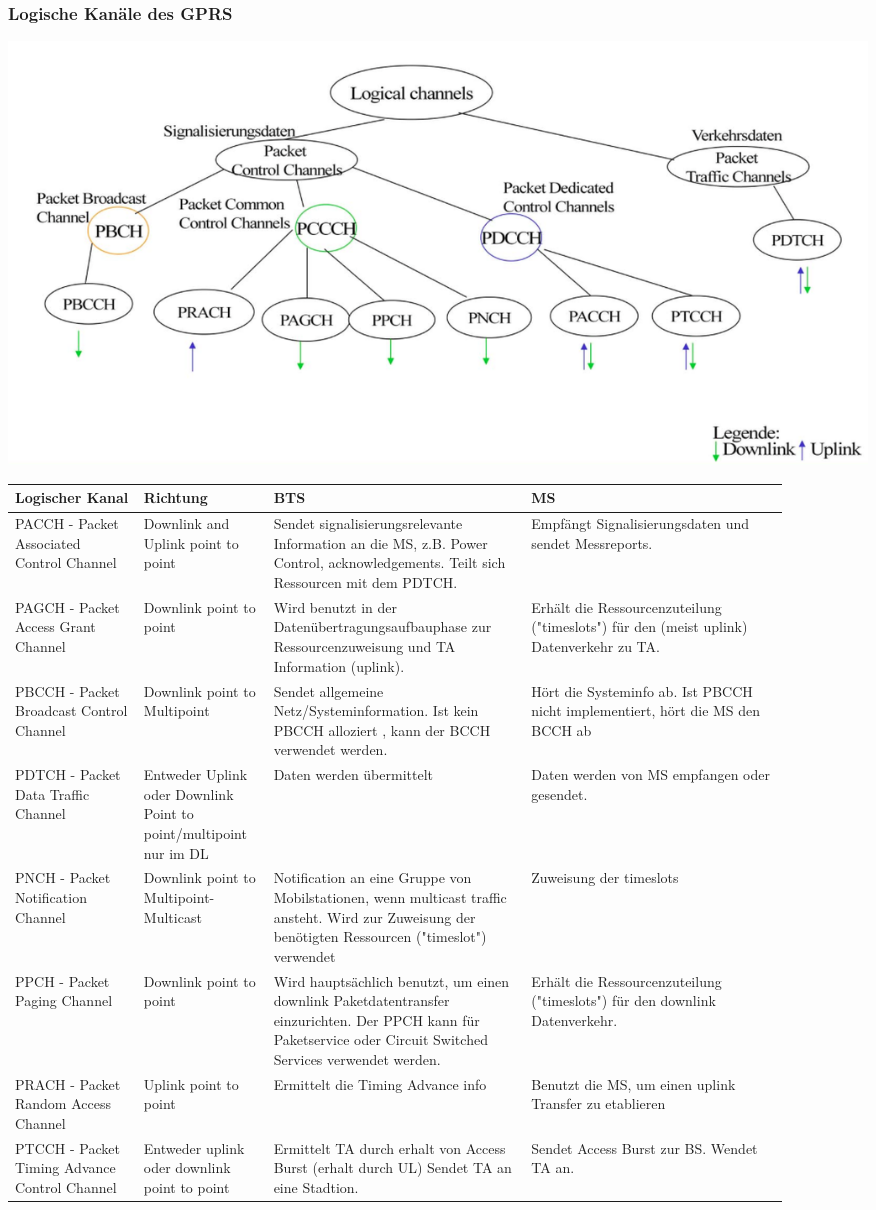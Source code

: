 \subsubsection{Logische Kanäle des GPRS}
\includegraphics[width = 0.6 \linewidth]{./Pics/GPRSKanaele}

\begin{tabular}{p{0.15 \linewidth} p{0.15 \linewidth} p{0.3 \linewidth} p{0.3 \linewidth}}
\toprule
Logischer Kanal & Richtung & BTS & MS \\
\midrule
PACCH - Packet Associated Control Channel & Downlink and Uplink point to point & Sendet signalisierungsrelevante Information an die MS, z.B. Power Control, acknowledgements. Teilt sich Ressourcen mit dem PDTCH. & Empfängt Signalisierungsdaten und sendet Messreports.\\
\midrule
PAGCH - Packet Access Grant Channel & Downlink point to point & Wird benutzt in der Datenübertragungsaufbauphase zur Ressourcenzuweisung und TA Information (uplink). & Erhält die Ressourcenzuteilung ("timeslots") für den (meist uplink) Datenverkehr zu TA. \\
\midrule
PBCCH - Packet Broadcast Control Channel & Downlink point to Multipoint & Sendet allgemeine Netz/Systeminformation. Ist kein PBCCH alloziert , kann der BCCH verwendet werden. & Hört die Systeminfo ab. Ist PBCCH nicht implementiert, hört die MS den BCCH ab \\
\midrule
PDTCH - Packet Data Traffic Channel & Entweder Uplink oder Downlink Point to point/multipoint nur im DL & Daten werden übermittelt & Daten werden von MS empfangen oder gesendet. \\
\midrule
PNCH - Packet Notification Channel & Downlink point to Multipoint-Multicast & Notification an eine Gruppe von Mobilstationen, wenn multicast traffic ansteht. Wird zur Zuweisung der benötigten Ressourcen ("timeslot") verwendet & Zuweisung der timeslots\\
\midrule
PPCH - Packet Paging Channel & Downlink point to point & Wird hauptsächlich benutzt, um einen downlink Paketdatentransfer einzurichten. Der PPCH kann für Paketservice oder Circuit Switched Services verwendet werden. & Erhält die Ressourcenzuteilung ("timeslots") für den downlink Datenverkehr. \\
\midrule
PRACH - Packet Random Access Channel & Uplink point to point & Ermittelt die Timing Advance info & Benutzt die MS, um einen uplink Transfer zu etablieren \\
\midrule
PTCCH - Packet Timing Advance Control Channel & Entweder uplink oder downlink point to point & Ermittelt TA durch erhalt von Access Burst (erhalt durch UL) Sendet TA an eine Stadtion. & Sendet Access Burst zur BS. Wendet TA an. \\
\bottomrule
\end{tabular}
